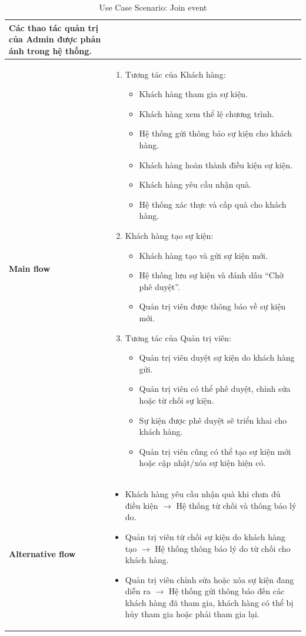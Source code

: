 \documentclass{article}
\begin{document}
\begin{table}[h!]
\begin{table}[h!]
\begin{tabular}{p{3cm} p{11cm}}
    Các thao tác quản trị của Admin được phản ánh trong hệ thống. \\ 
\hline
\vspace{0.025cm}
\textbf{Main flow} & 
\begin{enumerate}
    \item Tương tác của Khách hàng:
    \begin{itemize}
        \item Khách hàng tham gia sự kiện.
        \item Khách hàng xem thể lệ chương trình.
        \item Hệ thống gửi thông báo sự kiện cho khách hàng.
        \item Khách hàng hoàn thành điều kiện sự kiện.
        \item Khách hàng yêu cầu nhận quà.
        \item Hệ thống xác thực và cấp quà cho khách hàng.
    \end{itemize}
    \item Khách hàng tạo sự kiện:
    \begin{itemize}
        \item Khách hàng tạo và gửi sự kiện mới.
        \item Hệ thống lưu sự kiện và đánh dấu ``Chờ phê duyệt''.
        \item Quản trị viên được thông báo về sự kiện mới.
    \end{itemize}
    \item Tương tác của Quản trị viên:
    \begin{itemize}
        \item Quản trị viên duyệt sự kiện do khách hàng gửi.
        \item Quản trị viên có thể phê duyệt, chỉnh sửa hoặc từ chối sự kiện.
        \item Sự kiện được phê duyệt sẽ triển khai cho khách hàng.
        \item Quản trị viên cũng có thể tạo sự kiện mới hoặc cập nhật/xóa sự kiện hiện có.
    \end{itemize}
\end{enumerate} \\ 
\hline
\vspace{0.025cm}
\textbf{Alternative flow} & 
\begin{itemize}
    \item[1a.] Khách hàng yêu cầu nhận quà khi chưa đủ điều kiện $\rightarrow$ Hệ thống từ chối và thông báo lý do.
    \item[2a.] Quản trị viên từ chối sự kiện do khách hàng tạo $\rightarrow$ Hệ thống thông báo lý do từ chối cho khách hàng.
    \item[3a.] Quản trị viên chỉnh sửa hoặc xóa sự kiện đang diễn ra $\rightarrow$ Hệ thống gửi thông báo đến các khách hàng đã tham gia, khách hàng có thể bị hủy tham gia hoặc phải tham gia lại.
\end{itemize} \\ 
\hline
\end{tabular}
\caption{Use Case Scenario: Join event}
\end{table}
\newpage


\end{table}
\end{document}
